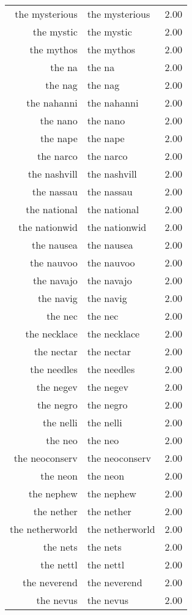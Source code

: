 \begin{table}[ht]
\begin{tabular}{rlr}
  the mysterious & the mysterious & 2.00 \\ 
  the mystic & the mystic & 2.00 \\ 
  the mythos & the mythos & 2.00 \\ 
  the na & the na & 2.00 \\ 
  the nag & the nag & 2.00 \\ 
  the nahanni & the nahanni & 2.00 \\ 
  the nano & the nano & 2.00 \\ 
  the nape & the nape & 2.00 \\ 
  the narco & the narco & 2.00 \\ 
  the nashvill & the nashvill & 2.00 \\ 
  the nassau & the nassau & 2.00 \\ 
  the national & the national & 2.00 \\ 
  the nationwid & the nationwid & 2.00 \\ 
  the nausea & the nausea & 2.00 \\ 
  the nauvoo & the nauvoo & 2.00 \\ 
  the navajo & the navajo & 2.00 \\ 
  the navig & the navig & 2.00 \\ 
  the nec & the nec & 2.00 \\ 
  the necklace & the necklace & 2.00 \\ 
  the nectar & the nectar & 2.00 \\ 
  the needles & the needles & 2.00 \\ 
  the negev & the negev & 2.00 \\ 
  the negro & the negro & 2.00 \\ 
  the nelli & the nelli & 2.00 \\ 
  the neo & the neo & 2.00 \\ 
  the neoconserv & the neoconserv & 2.00 \\ 
  the neon & the neon & 2.00 \\ 
  the nephew & the nephew & 2.00 \\ 
  the nether & the nether & 2.00 \\ 
  the netherworld & the netherworld & 2.00 \\ 
  the nets & the nets & 2.00 \\ 
  the nettl & the nettl & 2.00 \\ 
  the neverend & the neverend & 2.00 \\ 
  the nevus & the nevus & 2.00 \\ 

\end{tabular}
\end{table}
